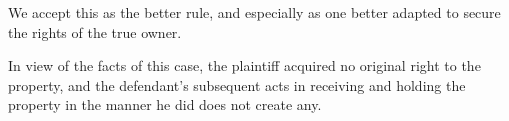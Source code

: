 We accept this as the better rule, and especially as one better adapted to
secure the rights of the true owner.

In view of the facts of this case, the plaintiff acquired no original right to
the property, and the defendant's subsequent acts in receiving and holding the
property in the manner he did does not create any.

